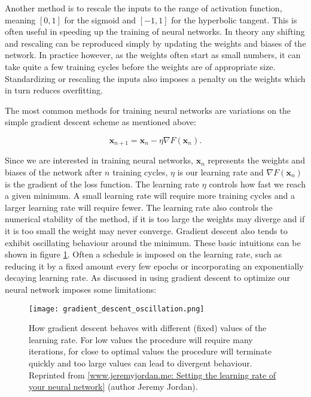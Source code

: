 Another method is to rescale the inputs to the range of activation
function, meaning $\left[0, 1\right]$ for the sigmoid
and $\left[-1, 1\right]$ for the hyperbolic tangent.
This is often useful in speeding up the training of neural networks.
In theory any shifting and rescaling can be reproduced simply
by updating the weights and biases of the network.
In practice however, as the weights often start as
small numbers, it can take quite a few training cycles before
the weights are of appropriate size.
Standardizing or rescaling the inputs also imposes a penalty on the weights
which in turn reduces overfitting.
\par
The most common methods for training neural networks
are variations on the simple gradient descent scheme as mentioned
above:

\begin{equation}
 \bm{x}_{n+1} = \bm{x}_{n} - \eta \nabla F(\bm{x}_n) . 
\end{equation}

Since we are interested in training neural networks,
$\bm{x}_{n}$ represents the weights and biases of the network
after $n$ training cycles, $\eta$ is our learning rate
and $\nabla F(\bm{x}_n)$ is the gradient of the loss function.
The learning rate $\eta$ controls how fast we reach a given minimum.
A small learning rate will require more training cycles
and a larger learning rate will require fewer.
The learning rate also controls the numerical stability
of the method, if it is too large the weights may diverge
and if it is too small the weight may never converge.
Gradient descent also tends to exhibit oscillating behaviour
around the minimum. These basic intuitions can be shown
in figure \ref{fig:gradient-descent-oscillations}.
Often a schedule is imposed
on the learning rate, such as reducing it by a fixed amount
every few epochs or incorporating an exponentially decaying learning rate.
As discussed in \parencite[Mehta et. al]{mehta2019high} 
using gradient descent to optimize our neural network imposes some limitations:

\begin{figure}[H]
    \texttt{[image: gradient\_descent\_oscillation.png]}
    \caption{How gradient descent behaves with different (fixed)
    values of the learning rate.
    For low values the procedure will require many iterations, for
    close to optimal values the procedure will terminate quickly
    and too large values can lead to divergent behaviour.
    Reprinted from \href{https://www.jeremyjordan.me/nn-learning-rate/}{
        [www.jeremyjordan.me:
        Setting the learning rate of your neural network]} (author
    Jeremy Jordan).}
    \label{fig:gradient-descent-oscillations}
\end{figure}

